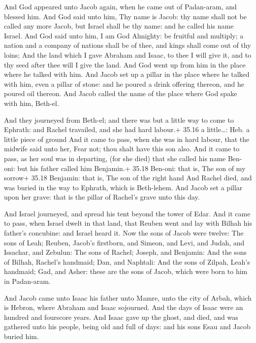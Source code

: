  And God appeared unto Jacob again, when he came out of
Padan-aram, and blessed him.  And God said unto him, Thy
name is Jacob: thy name shall not be called any more Jacob, but Israel
shall be thy name: and he called his name Israel.  And God
said unto him, I am God Almighty: be fruitful and multiply; a nation and
a company of nations shall be of thee, and kings shall come out of thy
loins;  And the land which I gave Abraham and Isaac, to
thee I will give it, and to thy seed after thee will I give the land.
 And God went up from him in the place where he talked with
him.  And Jacob set up a pillar in the place where he
talked with him, even a pillar of stone: and he poured a drink offering
thereon, and he poured oil thereon.  And Jacob called the
name of the place where God spake with him, Beth-el.

 And they journeyed from Beth-el; and there was but a
little way to come to Ephrath: and Rachel travailed, and she had hard
labour.+ 35.16 a little\ldots: Heb. a little piece of ground
 And it came to pass, when she was in hard labour, that the
midwife said unto her, Fear not; thou shalt have this son also.
 And it came to pass, as her soul was in departing, (for
she died) that she called his name Ben-oni: but his father called him
Benjamin.+ 35.18 Ben-oni: that is, The son of my sorrow+ 35.18 Benjamin:
that is, The son of the right hand  And Rachel died, and
was buried in the way to Ephrath, which is Beth-lehem.  And
Jacob set a pillar upon her grave: that is the pillar of Rachel's grave
unto this day.

 And Israel journeyed, and spread his tent beyond the
tower of Edar.  And it came to pass, when Israel dwelt in
that land, that Reuben went and lay with Bilhah his father's concubine:
and Israel heard it. Now the sons of Jacob were twelve: 
The sons of Leah; Reuben, Jacob's firstborn, and Simeon, and Levi, and
Judah, and Issachar, and Zebulun:  The sons of Rachel;
Joseph, and Benjamin:  And the sons of Bilhah, Rachel's
handmaid; Dan, and Naphtali:  And the sons of Zilpah,
Leah's handmaid; Gad, and Asher: these are the sons of Jacob, which were
born to him in Padan-aram.

 And Jacob came unto Isaac his father unto Mamre, unto
the city of Arbah, which is Hebron, where Abraham and Isaac sojourned.
 And the days of Isaac were an hundred and fourscore years.
 And Isaac gave up the ghost, and died, and was gathered
unto his people, being old and full of days: and his sons Esau and Jacob
buried him.


